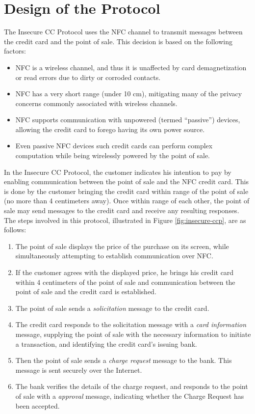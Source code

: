 \section{Design of the Protocol}
\label{sec:insecure-design}

The Insecure CC Protocol uses the NFC channel to transmit messages between the credit card and the point of sale.
This decision is based on the following factors:
\begin{itemize}
\item NFC is a wireless channel, and thus it is unaffected by card demagnetization or read errors due to dirty or corroded contacts.
\item NFC has a very short range (under 10 cm), mitigating many of the privacy concerns commonly associated with wireless channels.
\item NFC supports communication with unpowered (termed ``passive'') devices, allowing the credit card to forego having its own power source.
\item Even passive NFC devices such credit cards can perform complex computation while being wirelessly powered by the point of sale.
\end{itemize}

In the Insecure CC Protocol, the customer indicates his intention to pay by enabling communication between the point of sale and the NFC credit card.
This is done by the customer bringing the credit card within range of the point of sale (no more than 4 centimeters away).
Once within range of each other, the point of sale may send messages to the credit card and receive any resulting responses.
The steps involved in this protocol, illustrated in Figure \ref{fig:insecure-ccp}, are as follows:

\begin{enumerate}
\item The point of sale displays the price of the purchase on its screen, while simultaneously attempting to establish communication over NFC.
\item If the customer agrees with the displayed price, he brings his credit card within 4 centimeters of the point of sale and communication between the point of sale and the credit card is established.
\item The point of sale sends a \emph{solicitation} message to the credit card.
\item The credit card responds to the solicitation message with a \emph{card information} message, supplying the point of sale with the necessary information to initiate a transaction,
	and identifying the credit card's issuing bank.
\item Then the point of sale sends a \emph{charge request} message to the bank. This message is sent securely over the Internet.
\item The bank verifies the details of the charge request, and responds to the point of sale with a \emph{approval} message, indicating whether the Charge Request has been accepted.
\end{enumerate}


